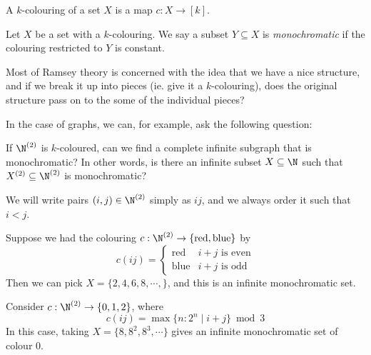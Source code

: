 \documentclass[a4paper]{article}
\begin{document}
\begin{defi}[$k$-colouring]
  A $k$-colouring of a set $X$ is a map $c: X \to [k]$.
\end{defi}

\begin{defi}
  Let $X$ be a set with a $k$-colouring. We say a subset $Y \subseteq X$ is \emph{monochromatic} if the colouring restricted to $Y$ is constant.
\end{defi}
Most of Ramsey theory is concerned with the idea that we have a nice structure, and if we break it up into pieces (ie. give it a $k$-colouring), does the original structure pass on to the some of the individual pieces?

In the case of graphs, we can, for example, ask the following question:
\begin{question}
  If $\N^{(2)}$ is $k$-coloured, can we find a complete infinite subgraph that is monochromatic? In other words, is there an infinite subset $X \subseteq \N$ such that $X^{(2)} \subseteq \N^{(2)}$ is monochromatic?
\end{question}

\begin{notation}
  We will write pairs $(i, j) \in \N^{(2)}$ simply as $ij$, and we always order it such that $i < j$.
\end{notation}

\begin{eg}
  Suppose we had the colouring $c: \N^{(2)} \to \{\mathrm{red}, \mathrm{blue}\}$ by
  \[
    c(ij) =
    \begin{cases}
      \mathrm{red} & i + j \text{ is even}\\
      \mathrm{blue} & i + j \text{ is odd}
    \end{cases}
  \]
  Then we can pick $X = \{2, 4, 6, 8, \cdots, \}$, and this is an infinite monochromatic set.
\end{eg}

\begin{eg}
  Consider $c: \N^{(2)} \to \{0, 1, 2\}$, where
  \[
    c(ij) = \max \{n: 2^n \mid i + j\} \bmod 3
  \]
  In this case, taking $X = \{8, 8^2, 8^3, \cdots\}$ gives an infinite monochromatic set of colour $0$.
\end{eg}
\end{document}
